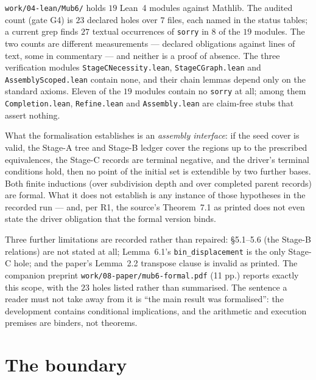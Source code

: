 \documentclass[10pt]{article}
\theoremstyle{definition}
\newcommand{\file}[1]{\texttt{\small #1}}
\begin{document}
\file{work/\allowbreak{}04-\allowbreak{}lean/\allowbreak{}Mub6/\allowbreak{}} holds $19$ Lean~4 modules against Mathlib. The audited count (gate G4) is
$23$ declared holes over $7$ files, each named in the status tables; a current grep finds $27$
textual occurrences of \texttt{sorry} in $8$ of the $19$ modules. The two counts are different measurements --- declared
obligations against lines of text, some in commentary --- and neither is a proof of absence.
The three verification modules \file{StageCNecessity.lean}, \file{StageCGraph.lean} and
\file{AssemblyScoped.lean} contain none, and their chain lemmas depend only on the standard axioms.
Eleven of the $19$ modules contain no \texttt{sorry} at all; among them \file{Completion.lean},
\file{Refine.lean} and \file{Assembly.lean} are claim-free stubs that assert nothing.

What the formalisation establishes is an \emph{assembly interface}: if the seed cover is valid, the
Stage-A tree and Stage-B ledger cover the regions up to the prescribed equivalences, the Stage-C
records are terminal negative, and the driver's terminal conditions hold, then no point of the initial
set is extendible by two further bases. Both finite inductions (over subdivision depth and over
completed parent records) are formal. What it does not establish is any instance of those hypotheses in
the recorded run --- and, per R1, the source's Theorem~7.1 as printed does not even state the driver
obligation that the formal version binds.

Three further limitations are recorded rather than repaired: \S5.1--5.6 (the Stage-B relations) are
not stated at all; Lemma~6.1's \texttt{bin\_displacement} is the only Stage-C hole; and the paper's
Lemma~2.2 transpose clause is invalid as printed. The companion preprint \file{work/\allowbreak{}08-\allowbreak{}paper/\allowbreak{}mub6-\allowbreak{}formal.pdf}
(11 pp.) reports exactly this scope, with the $23$ holes listed rather than summarised. The sentence a
reader must not take away from it is ``the main result was formalised'': the development contains
conditional implications, and the arithmetic and execution premises are binders, not theorems.

\section{The boundary}
\end{document}
